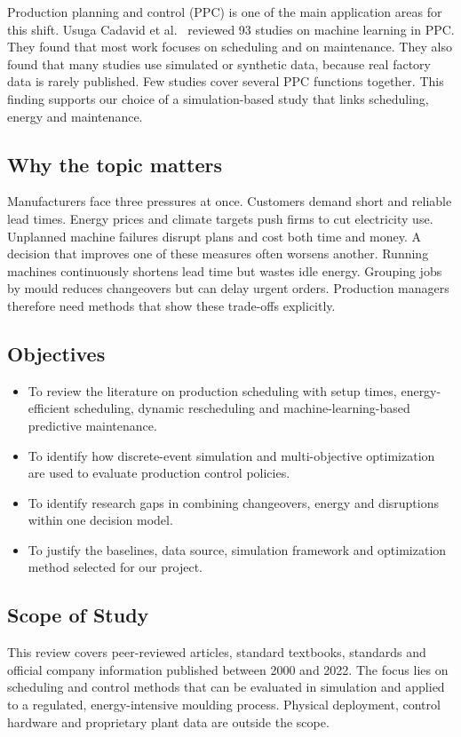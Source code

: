 \documentclass[11pt,a4paper]{article}
\begin{document}
Production planning and control (PPC) is one of the main application areas for this shift. Usuga Cadavid et al.\ \cite{usuga2020} reviewed 93 studies on machine learning in PPC. They found that most work focuses on scheduling and on maintenance. They also found that many studies use simulated or synthetic data, because real factory data is rarely published. Few studies cover several PPC functions together. This finding supports our choice of a simulation-based study that links scheduling, energy and maintenance.

\subsection{Why the topic matters}
Manufacturers face three pressures at once. Customers demand short and reliable lead times. Energy prices and climate targets push firms to cut electricity use. Unplanned machine failures disrupt plans and cost both time and money. A decision that improves one of these measures often worsens another. Running machines continuously shortens lead time but wastes idle energy. Grouping jobs by mould reduces changeovers but can delay urgent orders. Production managers therefore need methods that show these trade-offs explicitly.

\subsection{Objectives}
\begin{itemize}
  \item To review the literature on production scheduling with setup times, energy-efficient scheduling, dynamic rescheduling and machine-learning-based predictive maintenance.
  \item To identify how discrete-event simulation and multi-objective optimization are used to evaluate production control policies.
  \item To identify research gaps in combining changeovers, energy and disruptions within one decision model.
  \item To justify the baselines, data source, simulation framework and optimization method selected for our project.
\end{itemize}

\subsection{Scope of Study}
This review covers peer-reviewed articles, standard textbooks, standards and official company information published between 2000 and 2022. The focus lies on scheduling and control methods that can be evaluated in simulation and applied to a regulated, energy-intensive moulding process. Physical deployment, control hardware and proprietary plant data are outside the scope.
\end{document}
